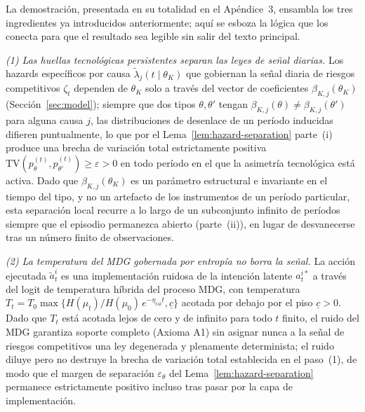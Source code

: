 \documentclass[review,authoryear,12pt]{elsarticle}
\theoremstyle{plain}
\theoremstyle{definition}
\newcommand{\1}{\mathbf{1}}
\begin{document}
La demostración, presentada en su totalidad en el Apéndice~3, ensambla los tres ingredientes ya introducidos anteriormente; aquí se esboza la lógica que los conecta para que el resultado sea legible sin salir del texto principal.

\emph{(1) Las huellas tecnológicas persistentes separan las leyes de señal diarias.} Los hazards específicos por causa $\tilde\lambda_j(t\mid\theta_K)$ que gobiernan la señal diaria de riesgos competitivos $\zeta_t$ dependen de $\theta_K$ solo a través del vector de coeficientes $\beta_{K,j}(\theta_K)$ (Sección~\ref{sec:model}); siempre que dos tipos $\theta,\theta'$ tengan $\beta_{K,j}(\theta)\neq\beta_{K,j}(\theta')$ para alguna causa $j$, las distribuciones de desenlace de un período inducidas difieren puntualmente, lo que por el Lema~\ref{lem:hazard-separation} parte~\textup{(i)} produce una brecha de variación total estrictamente positiva $\mathrm{TV}(p_\theta^{(t)},p_{\theta'}^{(t)})\ge\varepsilon>0$ en todo período en el que la asimetría tecnológica está activa. Dado que $\beta_{K,j}(\theta_K)$ es un parámetro estructural e invariante en el tiempo del tipo, y no un artefacto de los instrumentos de un período particular, esta separación local recurre a lo largo de un subconjunto infinito de períodos siempre que el episodio permanezca abierto (parte~\textup{(ii)}), en lugar de desvanecerse tras un número finito de observaciones.

\emph{(2) La temperatura del MDG gobernada por entropía no borra la señal.} La acción ejecutada $\tilde a_t^i$ es una implementación ruidosa de la intención latente $a_t^{i\ast}$ a través del logit de temperatura híbrida del proceso MDG, con temperatura $T_t=T_0\max\{H(\mu_t)/H(\mu_0)\,e^{-\eta_{\mathrm{cal}}t},\underline{c}\}$ acotada por debajo por el piso $\underline c>0$. Dado que $T_t$ está acotada lejos de cero y de infinito para todo $t$ finito, el ruido del MDG garantiza soporte completo (Axioma A1) sin asignar nunca a la señal de riesgos competitivos una ley degenerada y plenamente determinista; el ruido diluye pero no destruye la brecha de variación total establecida en el paso~(1), de modo que el margen de separación $\varepsilon_\theta$ del Lema~\ref{lem:hazard-separation} permanece estrictamente positivo incluso tras pasar por la capa de implementación.
\end{document}

